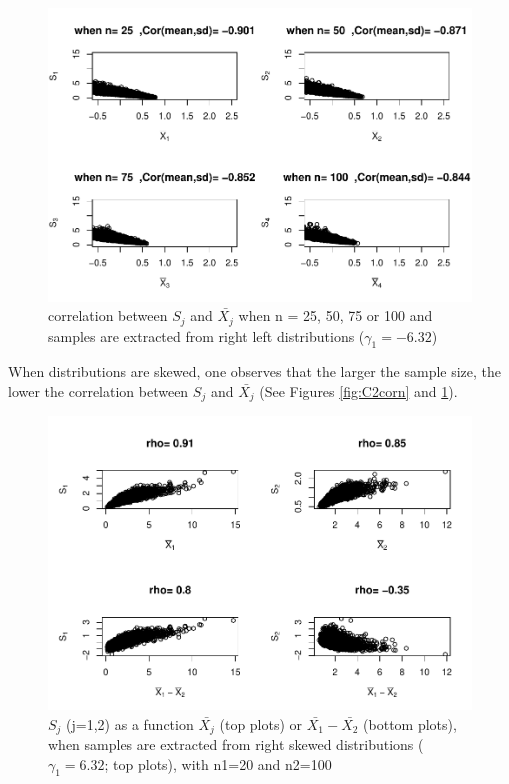 \documentclass[
  man]{apa6}
\begin{document}
\begin{figure}
\centering
\includegraphics{Correlations-between-the-sample-means-difference-and-standardizers-of-all-estimators,-and-implications-on-biases-and-variances-of-all-estimators_files/figure-latex/C2corn2-1.pdf}
\caption{\label{fig:C2corn2}correlation between \(S_j\) and \(\bar{X_j}\) when n = 25, 50, 75 or 100 and samples are extracted from right left distributions (\(\gamma_1 = -6.32\))}
\end{figure}

When distributions are skewed, one observes that the larger the sample size, the lower the correlation between \(S_j\) and \(\bar{X_j}\) (See Figures \ref{fig:C2corn} and \ref{fig:C2corn2}).

\begin{figure}
\centering
\includegraphics{Correlations-between-the-sample-means-difference-and-standardizers-of-all-estimators,-and-implications-on-biases-and-variances-of-all-estimators_files/figure-latex/SDC2Rs-1.pdf}
\caption{\label{fig:SDC2Rs}\(S_j\) (j=1,2) as a function \(\bar{X_j}\) (top plots) or \(\bar{X_1}-\bar{X_2}\) (bottom plots), when samples are extracted from right skewed distributions (\(\gamma_1 = 6.32\); top plots), with n1=20 and n2=100}
\end{figure}
\end{document}
